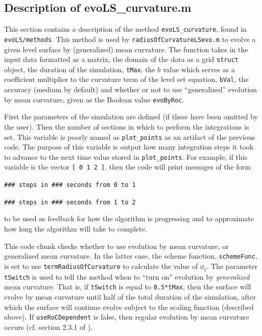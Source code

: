 \documentclass{article}
\begin{document}
\subsection{Description of evoLS\_curvature.m}
\label{sec:evols_curvature}



This section contains a description of the method
\texttt{evoLS\_curvature}, found in \texttt{evoLS/methods}. This
method is used by \texttt{radiusOfCurvatureLSevo.m} to evolve a
given level surface by (generalized) mean curvature. The function
takes in the input data formatted as a matrix, the domain of the
data as a grid \texttt{struct} object, the duration of the
simulation, \texttt{tMax}, the $b$ value which serves as a
coefficient multiplier to the curvature term of the level set
equation, \texttt{bVal}, the accuracy (medium by default) and
whether or not to use ``generalized'' evolution by mean
curvature, given as the Boolean value \texttt{evoByRoc}. 



First the parameters of the simulation are defined (if these have
been omitted by the user). Then the number of sections in which to
perform the integrations is set. This variable is poorly named as
\texttt{plot\_points} as an artifact of the previous code. The
purpose of this variable is output how many integration steps it
took to advance to the next time value stored in
\texttt{plot\_points}. For example, if this variable is the vector
\texttt{[ 0 1 2 ]}, then the code will print messages of the form

\texttt{\#\#\# steps in \#\#\# seconds from 0 to 1}

\vskip-12pt
\texttt{\#\#\# steps in \#\#\# seconds from 1 to 2}

to be used as feedback for how the algorithm is progressing and to
approximate how long the algorithm will take to complete. 





This code chunk checks whether to use evolution by mean curvature,
or generalized mean curvature. In the latter case, the scheme
function, \texttt{schemeFunc}, is set to use
\texttt{termRadiusOfCurvature} to calculate the value of
$\phi_t$. The parameter \texttt{tSwitch} is used to tell the
method when to ``turn on'' evolution by \emph{generalized} mean
curvature. That is, if \texttt{tSwitch} is equal to
\texttt{0.5*tMax}, then the surface will evolve by mean curvature
until half of the total duration of the simulation, after which
the surface will continue evolve subject to the scaling function
(described above). If \texttt{useRoCDependent} is false, then
regular evolution by mean curvature occurs (cf. section 2.3.1 of
\cite{mitchell}).
\end{document}
